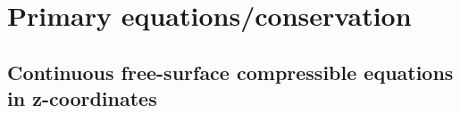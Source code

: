 \hypersetup{pdfborder=0 0 0}

\section{Primary equations/conservation}

 \subsection{Continuous free-surface compressible equations in z-coordinates}
\label{subsectiongenesystem}


